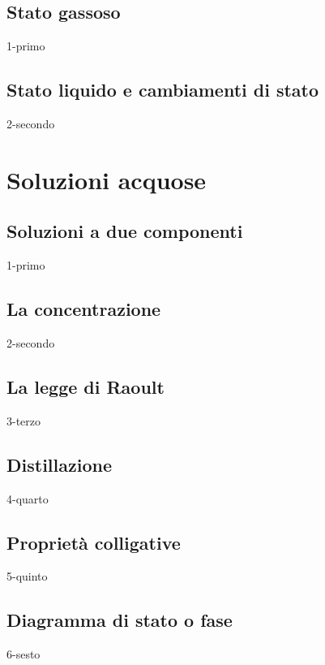 \documentclass[openany,12pt]{book}%
\begin{document}
  \section{Stato gassoso}
    {1-primo}

  \section{Stato liquido e cambiamenti di stato}
    {2-secondo}

\chapter{Soluzioni acquose}

  \section{Soluzioni a due componenti}
    {1-primo}

  \section{La concentrazione}
    {2-secondo}

  \section{La legge di Raoult}
    {3-terzo}

  \vspace{-0.3cm}\section{Distillazione}
  {4-quarto}

  \section{Proprietà colligative}
    {5-quinto}

    \newpage

  \section{Diagramma di stato o fase}
    {6-sesto}

    \newpage
\end{document}
